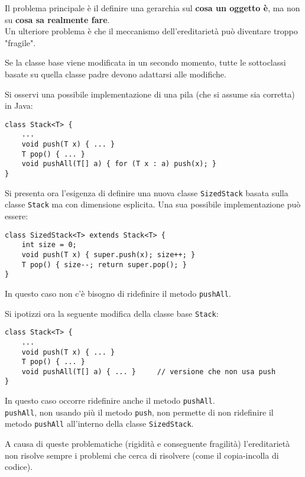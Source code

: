 \documentclass{article}
\begin{document}
Il problema principale è il definire una gerarchia sul \textbf{cosa un oggetto è}, ma non su \textbf{cosa sa realmente fare}.\vspace{14pt}\\
Un ulteriore problema è che il meccanismo dell'ereditarietà può diventare troppo "fragile". 

Se la classe base viene modificata in un secondo momento, tutte le sottoclassi basate su quella classe padre devono adattarsi alle modifiche.

Si osservi una possibile implementazione di una pila (che si assume sia corretta) in Java:
\begin{tcolorbox}
\begin{verbatim}
class Stack<T> {
    ...
    void push(T x) { ... }
    T pop() { ... }
    void pushAll(T[] a) { for (T x : a) push(x); }
}
\end{verbatim}
\end{tcolorbox}

\pagebreak

Si presenta ora l'esigenza di definire una nuova classe \texttt{SizedStack} basata sulla classe \texttt{Stack} ma con dimensione esplicita. Una sua possibile implementazione può essere:
\begin{tcolorbox}
\begin{verbatim}
class SizedStack<T> extends Stack<T> {
    int size = 0;
    void push(T x) { super.push(x); size++; }
    T pop() { size--; return super.pop(); }
}
\end{verbatim}
\end{tcolorbox}
In questo caso non c'è bisogno di ridefinire il metodo \texttt{pushAll}.

Si ipotizzi ora la seguente modifica della classe base \texttt{Stack}:
\begin{tcolorbox}
\begin{verbatim}
class Stack<T> {
    ...
    void push(T x) { ... }
    T pop() { ... }
    void pushAll(T[] a) { ... }     // versione che non usa push
}
\end{verbatim}
\end{tcolorbox}
In questo caso occorre ridefinire anche il metodo \texttt{pushAll}.\\
\texttt{pushAll}, non usando più il metodo \texttt{push}, non permette di non ridefinire il metodo \texttt{pushAll} all'interno della classe \texttt{SizedStack}.

A causa di queste problematiche (rigidità e conseguente fragilità) l'ereditarietà non risolve sempre i problemi che cerca di risolvere (come il copia-incolla di codice).
\end{document}
